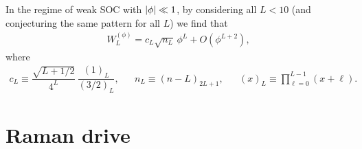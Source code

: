 \documentclass[nofootinbib,notitlepage,11pt]{revtex4-2}
\newcommand{\f}[2]{\dfrac{#1}{#2}} %
\newcommand{\p}[1]{\left(#1\right)} %
\newcommand{\1}{\mathds{1}}
\begin{document}
In the regime of weak SOC with $\abs{\phi}\ll1$, by considering all
$L<10$ (and conjecturing the same pattern for all $L$) we find that
\begin{align}
  W_L^{(\phi)} = c_L \sqrt{n_L}\, \phi^L + O\p{\phi^{L+2}},
\end{align}
where
\begin{align}
  c_L \equiv \f{\sqrt{L+1/2}}{4^L}\, \f{\p{1}_L}{\p{3/2}_L},
  &&
  n_L \equiv \p{n-L}_{2L+1},
  &&
  \p{x}_L \equiv \prod_{\ell=0}^{L-1} \p{x+\ell}.
\end{align}

\section{Raman drive}
\label{sec:drive_raman}
\end{document}
